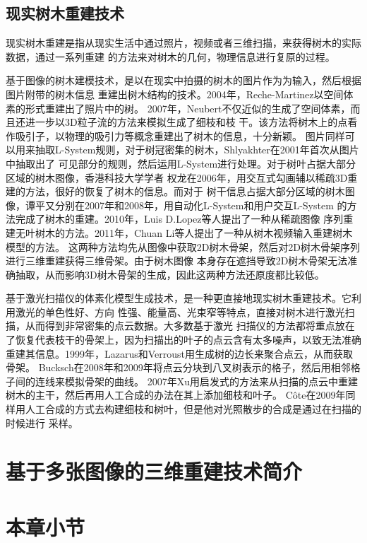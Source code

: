 \subsection{现实树木重建技术}
现实树木重建是指从现实生活中通过照片，视频或者三维扫描，来获得树木的实际数据，通过一系列重建
的方法来对树木的几何，物理信息进行复原的过程。

基于图像的树木建模技术，是以在现实中拍摄的树木的图片作为为输入，然后根据图片附带的树木信息
重建出树木结构的技术。2004年，Reche-Martinez以空间体素的形式重建出了照片中的树\cite{reche}。
2007年，Neubert不仅近似的生成了空间体素，而且还进一步以3D粒子流的方法来模拟生成了细枝和枝
干\cite{neubert}。该方法将树木上的点看作吸引子，以物理的吸引力等概念重建出了树木的信息，十分新颖。
图片同样可以用来抽取L-System规则，对于树冠密集的树木，Shlyakhter在2001年首次从图片中抽取出了
可见部分的规则，然后运用L-System进行处理。对于树叶占据大部分区域的树木图像，香港科技大学学者
权龙在2006年，用交互式勾画辅以稀疏3D重建的方法，很好的恢复了树木的信息\cite{quanlong}。而对于
树干信息占据大部分区域的树木图像，谭平又分别在2007年和2008年，用自动化L-System和用户交互L-System
的方法完成了树木的重建\cite{tanping,tanping2}。2010年，Luis D.Lopez等人提出了一种从稀疏图像
序列重建无叶树木的方法。2011年，Chuan Li等人提出了一种从树木视频输入重建树木模型的方法\cite{lichuan}。
这两种方法均先从图像中获取2D树木骨架，然后对2D树木骨架序列进行三维重建获得三维骨架。由于树木图像
本身存在遮挡导致2D树木骨架无法准确抽取，从而影响3D树木骨架的生成，因此这两种方法还原度都比较低。

基于激光扫描仪的体素化模型生成技术，是一种更直接地现实树木重建技术。它利用激光的单色性好、方向
性强、能量高、光束窄等特点，直接对树木进行激光扫描，从而得到非常密集的点云数据。大多数基于激光
扫描仪的方法都将重点放在了恢复代表枝干的骨架上，因为扫描出的叶子的点云含有太多噪声，以致无法准确
重建其信息。1999年，Lazarus和Verroust用生成树的边长来聚合点云，从而获取骨架\cite{verroust}。
Bucksch在2008年和2009年将点云分块到八叉树表示的格子，然后用相邻格子间的连线来模拟骨架的曲线\cite{bucksch}。
2007年Xu用启发式的方法来从扫描的点云中重建树木的主干，然后再用人工合成的办法在其上添加细枝和叶子\cite{xu}。
C\^ote在2009年同样用人工合成的方式去构建细枝和树叶，但是他对光照散步的合成是通过在扫描的时候进行
采样\cite{cote}。

\section{基于多张图像的三维重建技术简介}
\label{sec:mulimg3drecmethods}

\section{本章小节}
